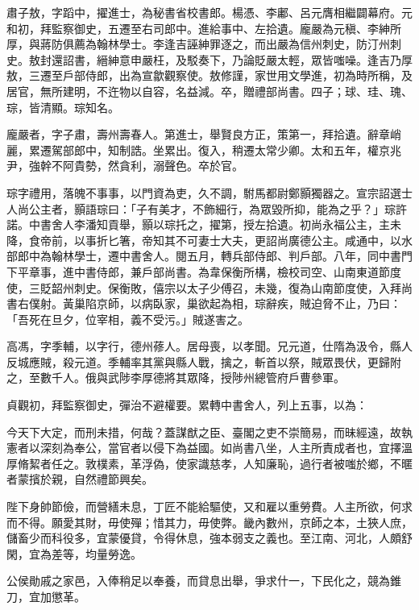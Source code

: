 \begin{pinyinscope}
 肅子敖，字蹈中，擢進士，為秘書省校書郎。楊憑、李鄘、呂元膺相繼闢幕府。元和初，拜監察御史，五遷至右司郎中。進給事中、左拾遺。龐嚴為元稹、李紳所厚，與蔣防俱薦為翰林學士。李逢吉誣紳罪逐之，而出嚴為信州刺史，防汀州刺史。敖封還詔書，縉紳意申嚴枉，及駁奏下，乃論貶嚴太輕，眾皆嗤噪。逢吉乃厚敖，三遷至戶部侍郎，出為宣歙觀察使。敖修謹，家世用文學進，初為時所稱，及居官，無所建明，不迕物以自容，名益減。卒，贈禮部尚書。四子；球、珪、瑰、琮，皆清顯。琮知名。



 龐嚴者，字子肅，壽州壽春人。第進士，舉賢良方正，策第一，拜拾遺。辭章峭麗，累遷駕部郎中，知制誥。坐累出。復入，稍遷太常少卿。太和五年，權京兆尹，強幹不阿貴勢，然貪利，溺聲色。卒於官。



 琮字禮用，落魄不事事，以門資為吏，久不調，駙馬都尉鄭顥獨器之。宣宗詔選士人尚公主者，顥語琮曰：「子有美才，不飾細行，為眾毀所抑，能為之乎？」琮許諾。中書舍人李潘知貢舉，顥以琮托之，擢第，授左拾遺。初尚永福公主，主未降，食帝前，以事折匕箸，帝知其不可妻士大夫，更詔尚廣德公主。咸通中，以水部郎中為翰林學士，遷中書舍人。閱五月，轉兵部侍郎、判戶部。八年，同中書門下平章事，進中書侍郎，兼戶部尚書。為韋保衡所構，檢校司空、山南東道節度使，三貶韶州刺史。保衡敗，僖宗以太子少傅召，未幾，復為山南節度使，入拜尚書右僕射。黃巢陷京師，以病臥家，巢欲起為相，琮辭疾，賊迫脅不止，乃曰：「吾死在旦夕，位宰相，義不受污。」賊遂害之。



 高馮，字季輔，以字行，德州蓚人。居母喪，以孝聞。兄元道，仕隋為汲令，縣人反城應賊，殺元道。季輔率其黨與縣人戰，擒之，斬首以祭，賊眾畏伏，更歸附之，至數千人。俄與武陟李厚德將其眾降，授陟州總管府戶曹參軍。



 貞觀初，拜監察御史，彈治不避權要。累轉中書舍人，列上五事，以為：



 今天下大定，而刑未措，何哉？蓋謀猷之臣、臺閣之吏不崇簡易，而昧經遠，故執憲者以深刻為奉公，當官者以侵下為益國。如尚書八坐，人主所責成者也，宜擇溫厚脩絜者任之。敦樸素，革浮偽，使家識慈孝，人知廉恥，過行者被嗤於鄉，不暱者蒙擯於親，自然禮節興矣。



 陛下身帥節儉，而營繕未息，丁匠不能給驅使，又和雇以重勞費。人主所欲，何求而不得。願愛其財，毋使殫；惜其力，毋使弊。畿內數州，京師之本，土狹人庶，儲畜少而科役多，宜蒙優貸，令得休息，強本弱支之義也。至江南、河北，人頗舒閑，宜為差等，均量勞逸。



 公侯勛戚之家邑，入俸稍足以奉養，而貸息出舉，爭求什一，下民化之，競為錐刀，宜加懲革。




\end{pinyinscope}

